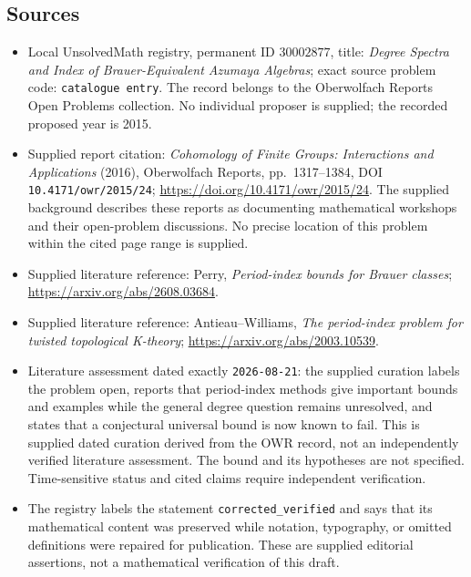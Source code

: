 \documentclass[11pt]{article}
\begin{document}
\subsection{Sources}
\begin{itemize}
\item Local UnsolvedMath registry, permanent ID \(30002877\), title: \emph{Degree Spectra and Index of Brauer-Equivalent Azumaya Algebras}; exact source problem code: \texttt{catalogue entry}. The record belongs to the Oberwolfach Reports Open Problems collection. No individual proposer is supplied; the recorded proposed year is 2015.
\item Supplied report citation: \emph{Cohomology of Finite Groups: Interactions and Applications} (2016), Oberwolfach Reports, pp.~1317--1384, DOI \texttt{10.4171/owr/2015/24}; \url{https://doi.org/10.4171/owr/2015/24}. The supplied background describes these reports as documenting mathematical workshops and their open-problem discussions. No precise location of this problem within the cited page range is supplied.
\item Supplied literature reference: Perry, \emph{Period-index bounds for Brauer classes}; \url{https://arxiv.org/abs/2608.03684}.
\item Supplied literature reference: Antieau--Williams, \emph{The period-index problem for twisted topological K-theory}; \url{https://arxiv.org/abs/2003.10539}.
\item Literature assessment dated exactly \texttt{2026-08-21}: the supplied curation labels the problem open, reports that period-index methods give important bounds and examples while the general degree question remains unresolved, and states that a conjectural universal bound is now known to fail. This is supplied dated curation derived from the OWR record, not an independently verified literature assessment. The bound and its hypotheses are not specified. Time-sensitive status and cited claims require independent verification.
\item The registry labels the statement \texttt{corrected\_verified} and says that its mathematical content was preserved while notation, typography, or omitted definitions were repaired for publication. These are supplied editorial assertions, not a mathematical verification of this draft.
\end{itemize}
\end{document}
